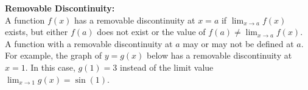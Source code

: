         \begin{center}
        \end{center}

        \noindent \color{purple} \textbf{Removable Discontinuity:} \color{black} \\
        A function $f(x)$ has a removable discontinuity at $x=a$ if $\lim_{x\to a}f(x)$ exists,
        but either $f(a)$ does not exist or the value of $f(a)\not=\lim_{x\to a}f(x)$.
        A function with a removable discontinuity at $a$ may or may not be defined at $a$.
        For example, the graph of $y=g(x)$ below has a removable discontinuity at $x=1$.
        In this case, $g(1)=3$ instead of the limit value $\lim_{x\to1}g(x)=\sin{(1)}$. \\

